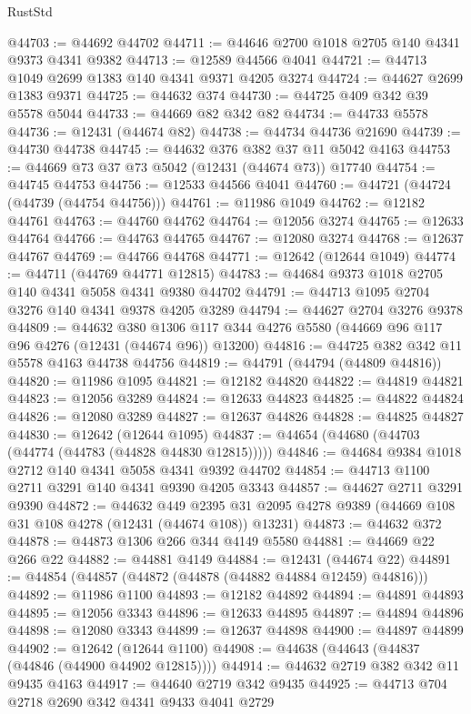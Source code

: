 \begin{lexlean}{RustStd}
\begin{coremodule}
@44703 := @44692 @44702
@44711 := @44646 @2700 @1018 @2705 @140 @4341 @9373 @4341 @9382
@44713 := @12589 @44566 @4041
@44721 := @44713 @1049 @2699 @1383 @140 @4341 @9371 @4205 @3274
@44724 := @44627 @2699 @1383 @9371
@44725 := @44632 @374
@44730 := @44725 @409 @342 @39 @5578 @5044
@44733 := @44669 @82 @342 @82
@44734 := @44733 @5578
@44736 := @12431 (@44674 @82)
@44738 := @44734 @44736 @21690
@44739 := @44730 @44738
@44745 := @44632 @376 @382 @37 @11 @5042 @4163
@44753 := @44669 @73 @37 @73 @5042 (@12431 (@44674 @73)) @17740
@44754 := @44745 @44753
@44756 := @12533 @44566 @4041
@44760 := @44721 (@44724 (@44739 (@44754 @44756)))
@44761 := @11986 @1049
@44762 := @12182 @44761
@44763 := @44760 @44762
@44764 := @12056 @3274
@44765 := @12633 @44764
@44766 := @44763 @44765
@44767 := @12080 @3274
@44768 := @12637 @44767
@44769 := @44766 @44768
@44771 := @12642 (@12644 @1049)
@44774 := @44711 (@44769 @44771 @12815)
@44783 := @44684 @9373 @1018 @2705 @140 @4341 @5058 @4341 @9380 @44702
@44791 := @44713 @1095 @2704 @3276 @140 @4341 @9378 @4205 @3289
@44794 := @44627 @2704 @3276 @9378
@44809 := @44632
    @380
    @1306
    @117
    @344
    @4276
    @5580
    (@44669 @96 @117 @96 @4276 (@12431 (@44674 @96)) @13200)
@44816 := @44725 @382 @342 @11 @5578 @4163 @44738 @44756
@44819 := @44791 (@44794 (@44809 @44816))
@44820 := @11986 @1095
@44821 := @12182 @44820
@44822 := @44819 @44821
@44823 := @12056 @3289
@44824 := @12633 @44823
@44825 := @44822 @44824
@44826 := @12080 @3289
@44827 := @12637 @44826
@44828 := @44825 @44827
@44830 := @12642 (@12644 @1095)
@44837 := @44654 (@44680 (@44703 (@44774 (@44783 (@44828 @44830 @12815)))))
@44846 := @44684 @9384 @1018 @2712 @140 @4341 @5058 @4341 @9392 @44702
@44854 := @44713 @1100 @2711 @3291 @140 @4341 @9390 @4205 @3343
@44857 := @44627 @2711 @3291 @9390
@44872 := @44632
    @449
    @2395
    @31
    @2095
    @4278
    @9389
    (@44669 @108 @31 @108 @4278 (@12431 (@44674 @108)) @13231)
@44873 := @44632 @372
@44878 := @44873 @1306 @266 @344 @4149 @5580
@44881 := @44669 @22 @266 @22
@44882 := @44881 @4149
@44884 := @12431 (@44674 @22)
@44891 := @44854 (@44857 (@44872 (@44878 (@44882 @44884 @12459) @44816)))
@44892 := @11986 @1100
@44893 := @12182 @44892
@44894 := @44891 @44893
@44895 := @12056 @3343
@44896 := @12633 @44895
@44897 := @44894 @44896
@44898 := @12080 @3343
@44899 := @12637 @44898
@44900 := @44897 @44899
@44902 := @12642 (@12644 @1100)
@44908 := @44638 (@44643 (@44837 (@44846 (@44900 @44902 @12815))))
@44914 := @44632 @2719 @382 @342 @11 @9435 @4163
@44917 := @44640 @2719 @342 @9435
@44925 := @44713 @704 @2718 @2690 @342 @4341 @9433 @4041 @2729

\end{coremodule}
\end{lexlean}

